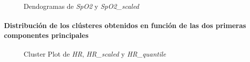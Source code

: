 \begin{figure}[ht]
    \centering
    \hfill
    \caption{Dendogramas de \textit{SpO2} y \textit{SpO2\_scaled}}\label{fig:per_den_spo2}
\end{figure}

\paragraph{Distribución de los clústeres obtenidos en función de las dos primeras componentes principales}

\begin{figure}[H]
    \centering
    \caption{Cluster Plot de \textit{HR}, \textit{HR\_scaled} y \textit{HR\_quantile}}
    \label{fig:per_pc_fc}
\end{figure}

